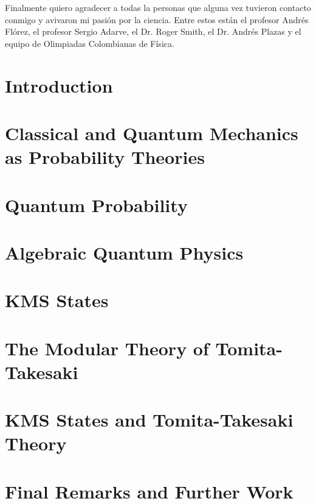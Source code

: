 \documentclass[12pt]{report}
\theoremstyle{definition}
\begin{document}
Finalmente quiero agradecer a todas la personas que alguna vez tuvieron contacto conmigo y avivaron mi pasión por la ciencia. Entre estos están el profesor Andrés Flórez, el profesor Sergio Adarve, el Dr. Roger Smith, el Dr. Andrés Plazas y el equipo de Olimpiadas Colombianas de Física. 

\tableofcontents

\chapter{Introduction}


\chapter{Classical and Quantum Mechanics as Probability Theories}\label{chp:axiom}


\chapter{Quantum Probability}\label{chp:logic}


\chapter{Algebraic Quantum Physics}\label{chp:algebra}


\chapter{KMS States}\label{chp:KMS}


\chapter{The Modular Theory of Tomita-Takesaki}\label{chp:tomita}


\chapter{KMS States and Tomita-Takesaki Theory}\label{chp:final}


\chapter{Final Remarks and Further Work}


\printbibliography
\end{document}
